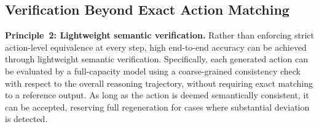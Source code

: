 \subsection{Verification Beyond Exact Action Matching}

\noindent \textbf{Principle~2: Lightweight semantic verification.}
Rather than enforcing strict action-level equivalence at every step, high end-to-end accuracy can be achieved through lightweight semantic verification.
Specifically, each generated action can be evaluated by a full-capacity model using a coarse-grained consistency check with respect to the overall reasoning trajectory, without requiring exact matching to a reference output.
As long as the action is deemed semantically consistent, it can be accepted, reserving full regeneration for cases where substantial deviation is detected.

\fi


